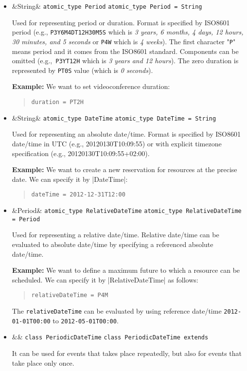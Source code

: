 \documentclass[a4paper]{report}
\newenvironment{Api}{\begin{itemize}}{\end{itemize}}
\newcommand{\ApiCode}[1]{\lstinline[style=styleApi]|#1|}
\newcommand{\ApiValue}[1]{\verb|#1|}
\newcommand{\ApiItem}[1]{\item #1 %

}
\newcommand{\ApiType}[2]{\ApiItem{%
  \ifx&#2& \ApiCode{atomic_type #1} \else \ApiCode{atomic_type #1 = #2} \fi}%
}
\newcommand{\ApiClass}[2]{\ApiItem{%
  \ifx&#2& \ApiCode{class #1} \else \ApiCode{class #1 extends #2} \fi}%
}
\newcommand{\ApiExample}{%

\textbf{Example:}
}
\begin{document}
\begin{Api}

\ApiType{Period}{String}
Used for representing period or duration. Format is specified by ISO8601 period (e.g., \ApiValue{P3Y6M4DT12H30M5S} which is \textit{3 years, 6 months, 4 days, 12 hours, 30 minutes, and 5 seconds} or \ApiValue{P4W} which is \textit{4 weeks}). The first character "\ApiValue{P}" means period and it comes from the ISO8601 standard. Components can be omitted (e.g.,~\ApiValue{P3YT12H} which is \textit{3 years and 12 hours}). The zero duration is represented by \ApiValue{PT0S} value (which is \textit{0 seconds}).

\ApiExample We want to set videoconference duration:
\begin{quote}
\begin{verbatim}
duration = PT2H
\end{verbatim}
\end{quote}

\ApiType{DateTime}{String}
Used for representing an absolute date/time. Format is specified by ISO8601 date/time in UTC (e.g., 20120130T10:09:55) or with explicit timezone specification (e.g., 20120130T10:09:55+02:00).

\ApiExample We want to create a new reservation for resources at the precise date. We can specify it by |DateTime|:
\begin{quote}
\begin{verbatim}
dateTime = 2012-12-31T12:00
\end{verbatim}
\end{quote}

\ApiType{RelativeDateTime}{Period}
Used for representing a relative date/time. Relative date/time can be evaluated to absolute date/time by specifying a referenced absolute date/time.

\ApiExample We want to define a maximum future to which a resource can be scheduled. We can specify it by |RelativeDateTime| as follows:
\begin{quote}
\begin{verbatim}
relativeDateTime = P4M
\end{verbatim}
\end{quote}
The \ApiValue{relativeDateTime} can be evaluated by using reference date/time \ApiValue{2012-01-01T00:00} to \ApiValue{2012-05-01T00:00}.

\ApiClass{PeriodicDateTime}{}
It can be used for events that takes place repeatedly, but also for events that take place only once.


\end{Api}
\end{document}

